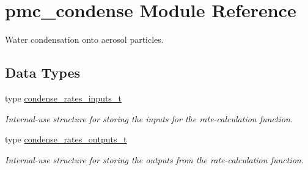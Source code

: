 \hypertarget{namespacepmc__condense}{}\section{pmc\+\_\+condense Module Reference}
\label{namespacepmc__condense}


Water condensation onto aerosol particles.  


\subsection*{Data Types}
\begin{DoxyCompactItemize}
\item 
type \mbox{\hyperlink{structpmc__condense_1_1condense__rates__inputs__t}{condense\+\_\+rates\+\_\+inputs\+\_\+t}}
\begin{DoxyCompactList}\small\item\em Internal-\/use structure for storing the inputs for the rate-\/calculation function. \end{DoxyCompactList}\item 
type \mbox{\hyperlink{structpmc__condense_1_1condense__rates__outputs__t}{condense\+\_\+rates\+\_\+outputs\+\_\+t}}
\begin{DoxyCompactList}\small\item\em Internal-\/use structure for storing the outputs from the rate-\/calculation function. \end{DoxyCompactList}\end{DoxyCompactItemize}
